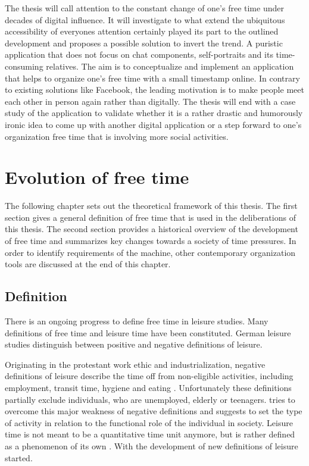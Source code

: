 \documentclass[12pt,numbers=noenddot,parskip,bibliography=totocnumbered,listof=totocnumbered,draft]{scrreprt}
\begin{document}
The thesis will call attention to the constant change of one's free time under decades of digital influence. It will investigate to what extend the ubiquitous accessibility of everyones attention certainly played its part to the outlined development and proposes a possible solution to invert the trend. A puristic application that does not focus on chat components, self-portraits and its time-consuming relatives. The aim is to conceptualize and implement an application that helps to organize one's free time with a small timestamp online. In contrary to existing solutions like Facebook, the leading motivation is to make people meet each other in person again rather than digitally. The thesis will end with a case study of the application to validate whether it is a rather drastic and humorously ironic idea to come up with another digital application or a step forward to one's organization free time that is involving more social activities.%

\chapter{Evolution of free time}
The following chapter sets out the theoretical framework of this thesis. The first section gives a general definition of free time that is used in the deliberations of this thesis. The second section provides a historical overview of the development of free time and summarizes key changes towards a society of time pressures. In order to identify requirements of the machine, other contemporary organization tools are discussed at the end of this chapter.

\section{Definition}
There is an ongoing progress to define free time in leisure studies. Many definitions of free time and leisure time have been constituted. German leisure studies distinguish between positive and negative definitions of leisure.

Originating in the protestant work ethic \citep[p.27]{weber2006} and industrialization, negative definitions of leisure describe the time off from non-eligible activities, including employment, transit time, hygiene and eating \citep[p.137]{prahl2002}. Unfortunately these definitions partially exclude individuals, who are unemployed, elderly or teenagers. \citeauthor{scheuch1972} tries to overcome this major weakness of negative definitions and suggests to set the type of activity in relation to the functional role of the individual in society. Leisure time is not meant to be a quantitative time unit anymore, but is rather defined as a phenomenon of its own \citep[p.31]{scheuch1972}. With \citeauthor{scheuch1972} the development of new definitions of leisure started.
\end{document}
